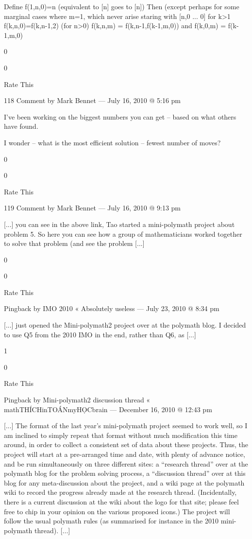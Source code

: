 {    Define f(1,n,0)=n (equivalent to [n] goes to [n])
    Then (except perhaps for some marginal cases where m=1, which never arise staring with [n,0 ... 0]
    for k>1 f(k,n,0)=f(k,n-1,2)
    (for n>0) f(k,n,m) = f(k,n-1,f(k-1,m,0))
    and f(k,0,m) = f(k-1,m,0)
     
    0
     
    0
     
    Rate This

    118 Comment by Mark Bennet — July 16, 2010 @ 5:16 pm

    I’ve been working on the biggest numbers you can get – based on what others have found.

    I wonder – what is the most efficient solution – fewest number of moves?
     
    0
     
    0
     
    Rate This

    119 Comment by Mark Bennet — July 16, 2010 @ 9:13 pm

    [...] you can see in the above link, Tao started a mini-polymath project about problem 5. So here you can see how a group of mathematicians worked together to solve that problem (and see the problem [...]
     
    0
     
    0
     
    Rate This

    Pingback by IMO 2010 « Absolutely useless — July 23, 2010 @ 8:34 pm

    [...] just opened the Mini-polymath2 project over at the polymath blog.  I decided to use Q5 from the 2010 IMO in the end, rather than Q6, as [...]
     
    1
     
    0
     
    Rate This

    Pingback by Mini-polymath2 discussion thread « mathTHÍCHinTOÁNmyHỌCbrain — December 16, 2010 @ 12:43 pm

    [...] The format of the last year’s mini-polymath project seemed to work well, so I am inclined to simply repeat that format without much modification this time around, in order to collect a consistent set of data about these projects.  Thus, the project will start at a pre-arranged time and date, with plenty of advance notice, and be run simultaneously on three different sites: a “research thread” over at the polymath blog for the problem solving process, a “discussion thread” over at this blog for any meta-discussion about the project, and a wiki page at the polymath wiki to record the progress already made at the research thread.  (Incidentally, there is a current discussion at the wiki about the logo for that site; please feel free to chip in your opinion on the various proposed icons.)  The project will follow the usual polymath rules (as summarised for instance in the 2010 mini-polymath thread). [...]
     
}
